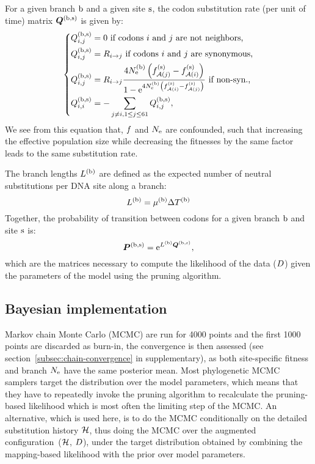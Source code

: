 For a given branch $\text{b}$ and a given site $\text{s}$, the codon substitution rate (per unit of time) matrix $\bm{Q}^{(\text{b}, \text{s})}$ is given by:
\begin{equation}
    \label{eq:subrates}
    \begin{dcases}
        \submatrix\branchsiteexp_{\itoj} = 0\text{ if codons $\ci$ and $\cj$ are not neighbors,} \\
        \submatrix\branchsiteexp_{\itoj} = \mutmatrix_{\nucitoj}\text{ if codons $\ci$ and $\cj$ are synonymous,} \\
        \submatrix\branchsiteexp_{\itoj} = \mutmatrix_{\nucitoj} \dfrac{4\Ne\branchexp \left({\fitj\siteexp - \fiti\siteexp}\right)}{{1 - \e^{4\Ne\branchexp\left({\fiti\siteexp - \fitj\siteexp}\right)} }} \text{ if non-syn.,}\\
        \submatrix\branchsiteexp_{\ci, \ci} = - \sum\limits_{ \cj \neq \ci, \jSetCodon} \submatrix\branchsiteexp_{\itoj},
    \end{dcases}
\end{equation}
We see from this equation that, $f$ and $N_{\text{e}}$ are confounded, such that increasing the effective population size while decreasing the fitnesses by the same factor leads to the same substitution rate.

The branch lengths $L^{(\text{b})}$ are defined as the expected number of neutral substitutions per \acrshort{DNA} site along a branch:
\begin{equation}
    \label{eq:branchlength}
    \branchlength\branchexp = \mu\branchexp \branchtime\branchexp
\end{equation}
Together, the probability of transition between codons for a given branch $\text{b}$ and site $\text{s}$ is:
\begin{equation}
    \label{eq:Probmatrix}
    \Probmatrix\branchsiteexp = \e^{\branchlength\branchexp \Submatrix\branchsiteexp},
\end{equation}
which are the matrices necessary to compute the likelihood of the data ($D$) given the parameters of the model using the pruning algorithm.

\subsection{Bayesian implementation}
\label{sec:Bayesian}
Markov chain Monte Carlo (\acrshort{MCMC}) are run for 4000 points and the first 1000 points are discarded as burn-in, the convergence is then assessed (see section~\ref{subsec:chain-convergence} in supplementary), as both site-specific fitness and branch $N_{\text{e}}$ have the same posterior mean.
Most phylogenetic \acrshort{MCMC} samplers target the distribution over the model parameters, which means that they have to repeatedly invoke the pruning algorithm to recalculate the pruning-based likelihood which is most often the limiting step of the \acrshort{MCMC}.
An alternative, which is used here, is to do the \acrshort{MCMC} conditionally on the detailed substitution history $\mathcal{H}$, thus doing the \acrshort{MCMC} over the augmented configuration~($\mathcal{H}$, $D$), under the target distribution obtained by combining the mapping-based likelihood with the prior over model parameters.

